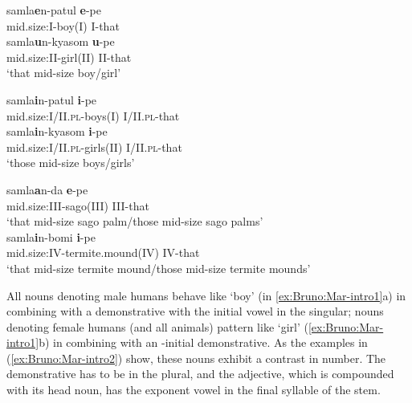 \documentclass[output=collectionpaper]{langsci/langscibook}
\begin{document}
\ea\label{ex:Bruno:Mar-intro1}
\begin{xlist}
\ex
\gll samla\GH\textbf{e}n-patul \textbf{e}-pe\\
mid.size:I-boy(I) I-that\\
\ex
\gll samla\GH\textbf{u}n-kyasom \textbf{u}-pe\\
mid.size:II-girl(II) II-that\\
\glt `that mid-size boy/girl'
\end{xlist}
\z

\ea\label{ex:Bruno:Mar-intro2}
\begin{xlist}
\ex
\gll samla\GH\textbf{i}n-patul \textbf{i}-pe\\
mid.size:I/II.\textsc{pl}-boys(I) I/II.\textsc{pl}-that\\
\ex
\gll samla\GH\textbf{i}n-kyasom \textbf{i}-pe\\
mid.size:I/II.\textsc{pl}-girls(II) I/II.\textsc{pl}-that\\
\glt `those mid-size boys/girls'
\end{xlist}
\z

\ea\label{ex:Bruno:Mar-intro3}
\begin{xlist}
\ex
\gll samla\GH\textbf{a}n-da \textbf{e}-pe\\
mid.size:III-sago(III) III-that\\
\glt `that mid-size sago palm/those mid-size sago palms'\\
\ex
\gll samla\GH\textbf{i}n-bomi \textbf{i}-pe\\
mid.size:IV-termite.mound(IV) IV-that\\
\glt `that mid-size termite mound/those mid-size termite mounds'\\
\end{xlist}
\z

\noindent All nouns denoting male humans behave like  `boy' (in \ref{ex:Bruno:Mar-intro1}a) in combining with a demonstrative with the initial vowel  in the singular; nouns denoting female humans (and all animals) pattern like  `girl' (\ref{ex:Bruno:Mar-intro1}b) in combining with an -initial demonstrative. As the examples in (\ref{ex:Bruno:Mar-intro2}) show, these nouns exhibit a contrast in number. The demonstrative has to be  in the plural, and the adjective, which is compounded with its head noun, has the exponent vowel  in the final syllable of the stem.
\end{document}
